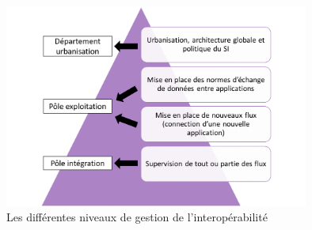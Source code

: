 			\begin{figure}[H]
				\centering
				\includegraphics[width=10cm]{../img/si_1.png}
				\caption{\label{niveaux_orga_interop} Les différentes niveaux de gestion de
				l'interopérabilité}
			\end{figure}
			
